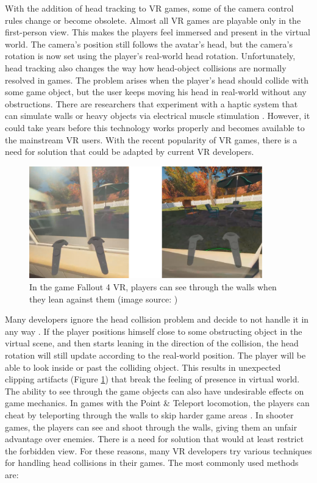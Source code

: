 With the addition of head tracking to VR games, some of the camera control rules change or become obsolete. Almost all VR games are playable only in the first-person view. This makes the players feel immersed and present in the virtual world. The camera's position still follows the avatar's head, but the camera's rotation is now set using the player’s real-world head rotation. Unfortunately, head tracking also changes the way how head-object collisions are normally resolved in games. The problem arises when the player's head should collide with some game object, but the user keeps moving his head in real-world without any obstructions. There are researchers that experiment with a haptic system that can simulate walls or heavy objects via electrical muscle stimulation \cite{HEPTICSYSTEM}. However, it could take years before this technology works properly and becomes available to the mainstream VR users. With the recent popularity of VR games, there is a need for solution that could be adapted by current VR developers.

\begin{figure}[th]
\centering
\includegraphics[width=0.9\textwidth]{img/clipping.png}
\caption{In the game Fallout 4 VR, players can see through the walls when they lean against them (image source: \cite{redditfallout})}
\label{fig:FALLOUTCLIPPING}
\end{figure}

Many developers ignore the head collision problem and decide to not handle it in any way \cite{OCULUSDOCCLIPPING}. If the player positions himself close to some obstructing object in the virtual scene, and then starts leaning in the direction of the collision, the head rotation will still update according to the real-world position. The player will be able to look inside or past the colliding object. This results in unexpected clipping artifacts (Figure \ref{fig:FALLOUTCLIPPING}) that break the feeling of presence in virtual world. The ability to see through the game objects can also have undesirable effects on game mechanics. In games with the Point \& Teleport locomotion, the players can cheat by teleporting through the walls to skip harder game areas \cite{SKYRIMTELEPORT}. In shooter games, the players can see and shoot through the walls, giving them an unfair advantage over enemies. There is a need for solution that would at least restrict the forbidden view. For these reasons, many VR developers try various techniques for handling head collisions in their games. The most commonly used methods are:

